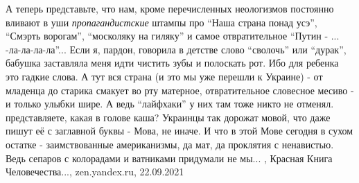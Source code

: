 А теперь представьте, что нам, кроме перечисленных неологизмов постоянно
вливают в уши \emph{пропагандистские} штампы про \enquote{Наша страна понад усэ}, \enquote{Смэрть
ворогам}, \enquote{москоляку на гиляку} и самое отвратительное \enquote{Путин - ...
-ла-ла-ла-ла}... Если я, пардон, говорила в детстве слово \enquote{сволочь} или
\enquote{дурак}, бабушка заставляла меня идти чистить зубы и полоскать рот. Ибо для
ребенка это гадкие слова. А тут вся страна (и это мы уже перешли к Украине) -
от младенца до старика смакует во рту матерное, отвратительное словесное месиво
- и только улыбки шире. А ведь \enquote{лайфхаки} у них там тоже никто не отменял.
представляете, какая в голове каша? Украинцы так дорожат мовой, что даже пишут
её с заглавной буквы - Мова, не иначе. И что в этой Мове сегодня в сухом
остатке - заимствованные американизмы, да мат, да проклятия с ненавистью. Ведь
сепаров с колорадами и ватниками придумали не мы...
, 
Красная Книга Человечества..., zen.yandex.ru, 22.09.2021
